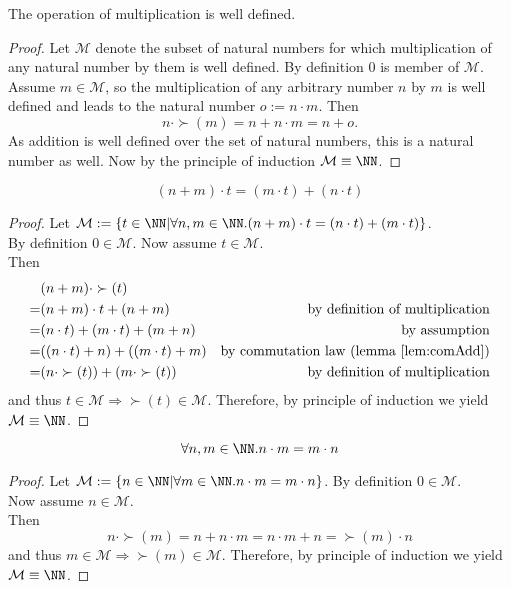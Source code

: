 \begin{lem}
	The operation of multiplication is well defined.
\end{lem}
\begin{proof}
	Let $\mathcal{M}$ denote the subset of natural numbers for which multiplication  of any natural number by them is well defined. 
	By definition 0 is member of $\mathcal{M}$. Assume $m\in \mathcal{M}$, so the multiplication of any arbitrary number $n$ by $m$ is well defined and leads to the natural number $o:=n\cdot m$. Then \[n\cdot \succ(m)=n+n\cdot m=n+o.\]
	As addition is well defined over the set of natural numbers, this is a natural number as well. Now by the principle of induction $\mathcal{M}\equiv \NN$. 
\end{proof}
\begin{lem}
	\label{lem:dist}
	\[(n+m)\cdot t=(m\cdot t)+(n\cdot t)\]
\end{lem}
\begin{proof} 
	Let $\mathcal{M}:=\{t\in\NN|\forall n, m\in\NN.(n+m)\cdot t=(n\cdot t)+(m\cdot t)\}$.\\
	By definition $0\in\mathcal{M}$. Now assume $t\in\mathcal{M}$. \\
	Then
	\begin{align*}
	&(n+m)\cdot \succ(t)\\
	=&(n+m)\cdot t+(n+m) &\text{by definition of multiplication}\\
	=&(n\cdot t)+(m\cdot t)+(m+n) &\text{by assumption}\\
	=&((n\cdot t)+n)+((m\cdot t)+m) &\text{by commutation law (lemma \ref{lem:comAdd})}\\
	=&(n\cdot \succ(t))+(m\cdot \succ(t)) &\text{by definition of multiplication}
	\end{align*}
	and thus $t\in\mathcal{M}\Rightarrow \succ(t)\in\mathcal{M}$.
	Therefore, by principle of induction we yield $\mathcal{M}\equiv\NN$.
\end{proof}
\begin{lem}
	\label{lem:commNat}
	\[\forall n, m\in\NN. n\cdot m=m\cdot n\]
\end{lem}
\begin{proof}
	Let $\mathcal{M}:=\{n\in\NN|\forall m\in\NN.n\cdot m=m\cdot n\}$.
	By definition $0\in\mathcal{M}$. \\
	Now assume $n\in\mathcal{M}$. \\
	Then \[n\cdot \succ(m)=n+n\cdot m=n\cdot m+n=\succ(m)\cdot n\]
	and thus $m\in\mathcal{M}\Rightarrow \succ(m)\in\mathcal{M}$.
	Therefore, by principle of induction we yield $\mathcal{M}\equiv\NN$.
\end{proof}
